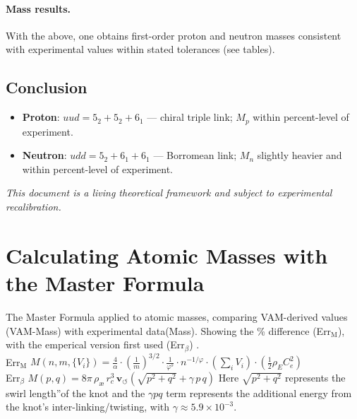 \documentclass[12pt]{article}
\begin{document}
  \paragraph{Mass results.}
  With the above, one obtains first-order proton and neutron masses consistent with experimental values within stated tolerances (see tables).

  \subsection{Conclusion}
  \begin{itemize}
      \item \textbf{Proton}: \(uud=5_2+5_2+6_1\) — chiral triple link; \(M_p\) within percent-level of experiment.
      \item \textbf{Neutron}: \(udd=5_2+6_1+6_1\) — Borromean link; \(M_n\) slightly heavier and within percent-level of experiment.
  \end{itemize}

\textit{This document is a living theoretical framework and subject to experimental recalibration.}

  
  

\appendix
      \section{Calculating Atomic Masses with the Master Formula}\label{sec:AtomicMasses}
  The Master Formula applied to atomic masses, comparing VAM-derived values (VAM-Mass) with experimental data(Mass). Showing the \% difference (Err$_\text{M}$), with the emperical version first used (Err$_\beta$)  .   \\ Err$_\text{M}$ \( M(n, m, \{V_i\}) = \frac{4}{\alpha} \cdot \left( \frac{1}{m} \right)^{3/2} \cdot \frac{1}{\varphi^s} \cdot n^{-1/\varphi} \cdot \left( \sum_i V_i \right) \cdot \left( \frac{1}{2} \rho_{\scriptscriptstyle\boldsymbol\!E}C_e^2 \right) \)\\
  Err$_\beta$ \(  M(p,q) = 8\pi\,\rho_{\text{\ae}}\,r_c^3\,\mathbf{v}_{\scriptscriptstyle\boldsymbol{\circlearrowleft}} \left(\sqrt{p^2 + q^2} + \gamma\, p\,q\right) \)
  Here $\sqrt{p^2+q^2}$ represents the \grqq swirl length\textquotedblright of the knot and the $\gamma p q$ term represents the additional energy from the knot's inter-linking/twisting, with $\gamma \approx 5.9\times10^{-3}$.
\end{document}
